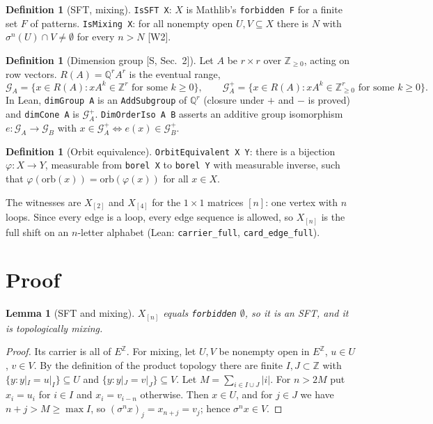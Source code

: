 \documentclass[11pt]{article}
\newtheorem{lemma}[theorem]{Lemma}
\theoremstyle{definition}
\newtheorem{definition}[theorem]{Definition}
\theoremstyle{remark}
\newcommand{\Z}{\mathbb{Z}}
\newcommand{\Q}{\mathbb{Q}}
\begin{document}
\begin{definition}[SFT, mixing]
\texttt{IsSFT X}: $X$ is Mathlib's \texttt{forbidden F} for a finite set $F$ of patterns.
\texttt{IsMixing X}: for all nonempty open $U,V\subseteq X$ there is $N$ with
$\sigma^n(U)\cap V\neq\emptyset$ for every $n>N$ [W2].
\end{definition}

\begin{definition}[Dimension group {[S, Sec.~2]}]
Let $A$ be $r\times r$ over $\Z_{\ge0}$, acting on row vectors. $R(A)=\Q^rA^r$ is the eventual range,
$$\mathcal G_A=\{x\in R(A): xA^k\in\Z^r\text{ for some }k\ge0\},\qquad
\mathcal G_A^+=\{x\in R(A): xA^k\in\Z_{\ge0}^r\text{ for some }k\ge0\}.$$
In Lean, \texttt{dimGroup A} is an \texttt{AddSubgroup} of $\Q^r$ (closure under $+$ and $-$ is
proved) and \texttt{dimCone A} is $\mathcal G_A^+$. \texttt{DimOrderIso A B} asserts an additive group
isomorphism $e:\mathcal G_A\to\mathcal G_B$ with $x\in\mathcal G_A^+\iff e(x)\in\mathcal G_B^+$.
\end{definition}

\begin{definition}[Orbit equivalence]
\texttt{OrbitEquivalent X Y}: there is a bijection $\varphi:X\to Y$, measurable from
\texttt{borel X} to \texttt{borel Y} with measurable inverse, such that
$\varphi(\mathrm{orb}(x))=\mathrm{orb}(\varphi(x))$ for all $x\in X$.
\end{definition}

The witnesses are $X_{[2]}$ and $X_{[4]}$ for the $1\times1$ matrices $[n]$: one vertex with $n$
loops. Since every edge is a loop, every edge sequence is allowed, so $X_{[n]}$ is the full shift on
an $n$-letter alphabet (Lean: \texttt{carrier\_full}, \texttt{card\_edge\_full}).

\section{Proof}

\begin{lemma}[SFT and mixing]
$X_{[n]}$ equals \texttt{forbidden} $\emptyset$, so it is an SFT, and it is topologically mixing.
\end{lemma}
\begin{proof}
Its carrier is all of $E^{\Z}$. For mixing, let $U,V$ be nonempty open in $E^{\Z}$, $u\in U$,
$v\in V$. By the definition of the product topology there are finite $I,J\subset\Z$ with
$\{y: y|_I=u|_I\}\subseteq U$ and $\{y:y|_J=v|_J\}\subseteq V$. Let $M=\sum_{i\in I\cup J}|i|$.
For $n>2M$ put $x_i=u_i$ for $i\in I$ and $x_i=v_{i-n}$ otherwise. Then $x\in U$, and for $j\in J$
we have $n+j>M\ge \max I$, so $(\sigma^nx)_j=x_{n+j}=v_j$; hence $\sigma^nx\in V$.
\end{proof}
\end{document}
